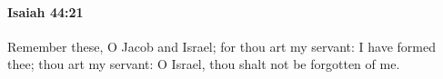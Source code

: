 
		\paragraph{Isaiah 44:21} %
			\label{ISAIAH-44-21}

			Remember these, O Jacob and Israel; for thou art my servant: I have formed thee; thou art my servant: O Israel, thou shalt not be forgotten of me.


